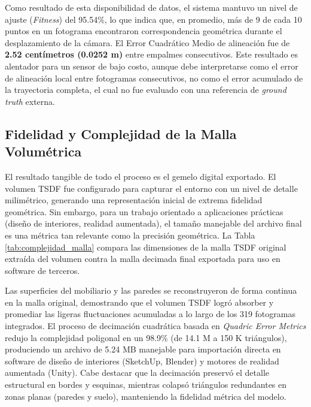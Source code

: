 \documentclass[12pt, a4, twoside, openany]{report}
\begin{document}
Como resultado de esta disponibilidad de datos, el sistema mantuvo un nivel de ajuste (\textit{Fitness}) del 95.54\%, lo que indica que, en promedio, más de 9 de cada 10 puntos en un fotograma encontraron correspondencia geométrica durante el desplazamiento de la cámara. El Error Cuadrático Medio de alineación fue de \textbf{2.52 centímetros (0.0252 m)} entre empalmes consecutivos. Este resultado es alentador para un sensor de bajo costo, aunque debe interpretarse como el error de alineación local entre fotogramas consecutivos, no como el error acumulado de la trayectoria completa, el cual no fue evaluado con una referencia de \textit{ground truth} externa.

\subsection{Fidelidad y Complejidad de la Malla Volumétrica}

El resultado tangible de todo el proceso es el gemelo digital exportado. El volumen TSDF fue configurado para capturar el entorno con un nivel de detalle milimétrico, generando una representación inicial de extrema fidelidad geométrica. Sin embargo, para un trabajo orientado a aplicaciones prácticas (diseño de interiores, realidad aumentada), el tamaño manejable del archivo final es una métrica tan relevante como la precisión geométrica. La Tabla \ref{tab:complejidad_malla} compara las dimensiones de la malla TSDF original extraída del volumen contra la malla decimada final exportada para uso en software de terceros.

\begin{table}[H]
\centering
\caption{Complejidad y Tamaño de Archivo: Malla TSDF Original vs. Malla Decimada Final}
\label{tab:complejidad_malla}
\end{table}

Las superficies del mobiliario y las paredes se reconstruyeron de forma continua en la malla original, demostrando que el volumen TSDF logró absorber y promediar las ligeras fluctuaciones acumuladas a lo largo de los 319 fotogramas integrados. El proceso de decimación cuadrática basada en \textit{Quadric Error Metrics} \cite{garland1997surface} redujo la complejidad poligonal en un 98.9\% (de 14.1 M a 150 K triángulos), produciendo un archivo de 5.24 MB manejable para importación directa en software de diseño de interiores (SketchUp, Blender) y motores de realidad aumentada (Unity). Cabe destacar que la decimación preservó el detalle estructural en bordes y esquinas, mientras colapsó triángulos redundantes en zonas planas (paredes y suelo), manteniendo la fidelidad métrica del modelo.
\end{document}
